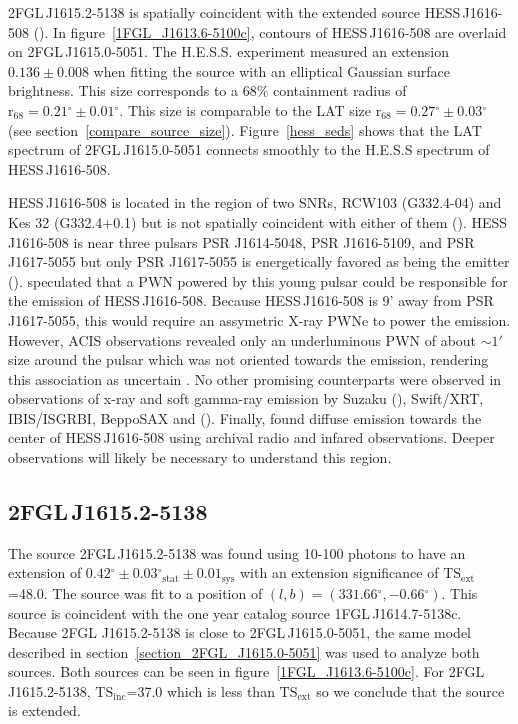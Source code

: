 \documentclass[12pt,preprint]{aastex}
\newcommand{\gev}{\text{GeV}\xspace}
\newcommand{\tev}{\text{TeV}\xspace}
\newcommand{\tsext}{{\ensuremath{\text{TS}_{\text{ext}}}}\xspace}
\newcommand{\tsinc}{\ensuremath{\text{TS}_{\text{inc}}}\xspace}
\newcommand{\chandra}{\text{{\em Chandra}}\xspace}
\newcommand{\xmmnewton}{\text{{\em XMM-Newton}}\xspace}
\newcommand{\rsixeight}{{\ensuremath{\text{r}_{68}}}\xspace}
\newcommand{\sys}{\text{sys}\xspace}
\newcommand{\stat}{\text{stat}\xspace}
\renewcommand{\deg}{\ensuremath{^\circ}\xspace}
\renewcommand{\approx}{\sim\!\xspace}
\begin{document}
2FGL\,J1615.2-5138 is spatially coincident with the extended
\tev source HESS\,J1616-508 (\cite{hess_plane_survey}).  In
figure~\ref{1FGL_J1613.6-5100c}, contours of HESS\,J1616-508 are overlaid
on 2FGL\,J1615.0-5051.  The H.E.S.S. experiment measured an
extension $0.136\pm 0.008$ when fitting the source with an elliptical
Gaussian surface brightness.  This size corresponds to a 68\% containment
radius of $\rsixeight=0.21\deg\pm0.01\deg$. This size is comparable to the LAT
size $\rsixeight=0.27\deg\pm0.03\deg$ (see section~\ref{compare_source_size}).
Figure~\ref{hess_seds} shows that the LAT spectrum of 2FGL\,J1615.0-5051
connects smoothly to the H.E.S.S spectrum of HESS\,J1616-508.

HESS\,J1616-508 is located in the region of two SNRs, RCW103
(G332.4-04) and Kes 32 (G332.4+0.1) but is not spatially coincident
with either of them (\cite{hess_plane_survey}).  HESS\,J1616-508 is near
three pulsars PSR J1614-5048, PSR J1616-5109, and PSR J1617-5055
but only PSR J1617-5055 is energetically favored as being the \tev
emitter (\cite{discovery_of_PSR_J1617-5055,integral_HESS_J1616-508}).
\cite{hess_plane_survey} speculated that a PWN powered by this young
pulsar could be responsible for the emission of HESS\,J1616-508.
Because HESS\,J1616-508 is 9' away from PSR J1617-5055, this would
require an assymetric X-ray PWNe to power the \tev emission. However,
\chandra ACIS observations revealed only an underluminous PWN of
about $\approx1'$ size around the pulsar which was not oriented
towards the \tev emission, rendering this association as uncertain
\cite{discovery_of_pwn_for_PSR_J1617-5055}.  No other promising
counterparts were observed in observations of x-ray and soft gamma-ray
emission by Suzaku (\cite{suzakzu_HESS_J1616-508}), Swift/XRT,
IBIS/ISGRBI, BeppoSAX and \xmmnewton (\cite{integral_HESS_J1616-508}).
Finally, \cite{discovery_of_pwn_for_PSR_J1617-5055} found diffuse
emission towards the center of HESS\,J1616-508 using archival radio and
infared observations.  Deeper observations will likely be necessary to
understand this region.

\subsection{2FGL\,J1615.2-5138}
\label{section_2FGL_J1615.2-5138}

The source 2FGL\,J1615.2-5138 was found using 10-100 \gev
photons to have an extension of $0.42\deg\pm0.03\deg_\stat\pm0.01_\sys$
with an extension significance of \tsext=48.0.  The source was fit to a
position of $(l,b)=(331.66\deg,-0.66\deg)$.  This source is coincident
with the one year catalog source 1FGL\,J1614.7-5138c.  Because 2FGL
J1615.2-5138 is close to 2FGL\,J1615.0-5051, the same model described
in section~\ref{section_2FGL_J1615.0-5051} was used to analyze both
sources. Both sources can be seen in figure~\ref{1FGL_J1613.6-5100c}.
For 2FGL\,J1615.2-5138, \tsinc=37.0 which is less than \tsext so we
conclude that the source is extended.
\end{document}
